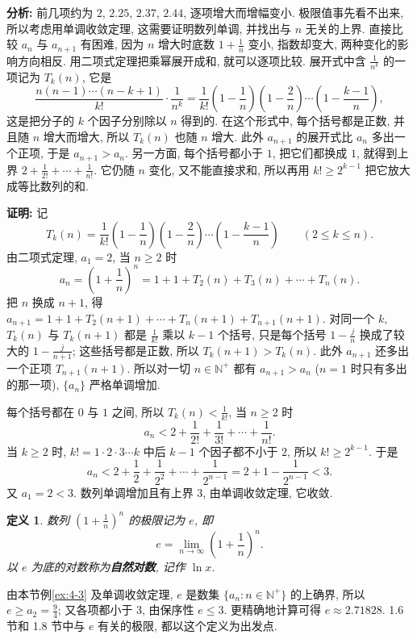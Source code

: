 \documentclass[UTF8,openany]{ctexbook}
\theoremstyle{chinesetextbook}
\newtheorem{definition}{定义}[section]
\newenvironment{cnproof}{\par\indent\textbf{证明:} \ignorespaces}{\par}
\begin{document}
\par\indent\textbf{分析:} 前几项约为 $2$, $2.25$, $2.37$, $2.44$, 逐项增大而增幅变小. 极限值事先看不出来, 所以考虑用单调收敛定理, 这需要证明数列单调, 并找出与 $n$ 无关的上界. 直接比较 $a_n$ 与 $a_{n+1}$ 有困难, 因为 $n$ 增大时底数 $\displaystyle1+\frac1n$ 变小, 指数却变大, 两种变化的影响方向相反. 用二项式定理把乘幂展开成和, 就可以逐项比较. 展开式中含 $\displaystyle\frac1{n^k}$ 的一项记为 $T_k(n)$, 它是
\[
\frac{n(n-1)\cdots(n-k+1)}{k!}\cdot\frac1{n^k}=\frac1{k!}\left(1-\frac1n\right)\left(1-\frac2n\right)\cdots\left(1-\frac{k-1}n\right),
\]
这是把分子的 $k$ 个因子分别除以 $n$ 得到的. 在这个形式中, 每个括号都是正数, 并且随 $n$ 增大而增大, 所以 $T_k(n)$ 也随 $n$ 增大. 此外 $a_{n+1}$ 的展开式比 $a_n$ 多出一个正项, 于是 $a_{n+1}>a_n$. 另一方面, 每个括号都小于 $1$, 把它们都换成 $1$, 就得到上界 $\displaystyle2+\frac1{2!}+\cdots+\frac1{n!}$. 它仍随 $n$ 变化, 又不能直接求和, 所以再用 $k!\ge2^{k-1}$ 把它放大成等比数列的和.
\begin{cnproof}
记
\[
T_k(n)=\frac1{k!}\left(1-\frac1n\right)\left(1-\frac2n\right)\cdots\left(1-\frac{k-1}n\right)\qquad(2\le k\le n).
\]
由二项式定理, $a_1=2$, 当 $n\ge2$ 时
\[
a_n=\left(1+\frac1n\right)^n=1+1+T_2(n)+T_3(n)+\cdots+T_n(n).
\]
把 $n$ 换成 $n+1$, 得 $a_{n+1}=1+1+T_2(n+1)+\cdots+T_n(n+1)+T_{n+1}(n+1)$. 对同一个 $k$, $T_k(n)$ 与 $T_k(n+1)$ 都是 $\displaystyle\frac1{k!}$ 乘以 $k-1$ 个括号, 只是每个括号 $\displaystyle1-\frac jn$ 换成了较大的 $\displaystyle1-\frac j{n+1}$; 这些括号都是正数, 所以 $T_k(n+1)>T_k(n)$. 此外 $a_{n+1}$ 还多出一个正项 $T_{n+1}(n+1)$. 所以对一切 $n\in\mathbb N^+$ 都有 $a_{n+1}>a_n$ ($n=1$ 时只有多出的那一项), $\{a_n\}$ 严格单调增加.

每个括号都在 $0$ 与 $1$ 之间, 所以 $\displaystyle T_k(n)<\frac1{k!}$, 当 $n\ge2$ 时
\[
a_n<2+\frac1{2!}+\frac1{3!}+\cdots+\frac1{n!}.
\]
当 $k\ge2$ 时, $k!=1\cdot2\cdot3\cdots k$ 中后 $k-1$ 个因子都不小于 $2$, 所以 $k!\ge2^{k-1}$. 于是
\[
a_n<2+\frac12+\frac1{2^2}+\cdots+\frac1{2^{n-1}}=2+1-\frac1{2^{n-1}}<3.
\]
又 $a_1=2<3$. 数列单调增加且有上界 $3$, 由单调收敛定理, 它收敛.
\end{cnproof}
\begin{definition}
数列 $\displaystyle\left(1+\frac1n\right)^n$ 的极限记为 $e$, 即
\[
e=\lim_{n\to\infty}\left(1+\frac1n\right)^n.
\]
以 $e$ 为底的对数称为\textbf{自然对数}, 记作 $\ln x$.
\end{definition}
由本节例\ref{ex:4-3} 及单调收敛定理, $e$ 是数集 $\{a_n:n\in\mathbb N^+\}$ 的上确界, 所以 $\displaystyle e\ge a_2=\frac94$; 又各项都小于 $3$, 由保序性 $e\le3$. 更精确地计算可得 $e\approx2.71828$. 1.6 节和 1.8 节中与 $e$ 有关的极限, 都以这个定义为出发点.
\end{document}
